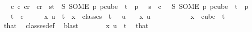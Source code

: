 \begin{isabellebody}
\ \ \ {\isachardoublequoteopen}{\isasymexists}c{}\ c{}{\isachardot}{\kern0pt}\ c{}{\isacharless}{\kern0pt}r\ {\isasymand}\ c{}{\isacharless}{\kern0pt}r\ {\isasymand}\ {\isacharparenleft}{\kern0pt}{\isasymforall}s{\isacharless}{\kern0pt}t{\isachardot}{\kern0pt}\ {\isasymchi}\ {\isacharparenleft}{\kern0pt}S\ {\isacharparenleft}{\kern0pt}SOME\ p{\isachardot}{\kern0pt}\ p{\isasymin}cube\ {}\ {\isacharparenleft}{\kern0pt}t{\isacharplus}{\kern0pt}{}{\isacharparenright}{\kern0pt}\ {\isasymand}\ p\ {}\ {\isacharequal}{\kern0pt}\ s{\isacharparenright}{\kern0pt}{\isacharparenright}{\kern0pt}\ {\isacharequal}{\kern0pt}\ c{}{\isacharparenright}{\kern0pt}\ {\isasymand}\ {\isasymchi}\ {\isacharparenleft}{\kern0pt}S\ {\isacharparenleft}{\kern0pt}SOME\ p{\isachardot}{\kern0pt}\ p{\isasymin}cube\ {}\ {\isacharparenleft}{\kern0pt}t{\isacharplus}{\kern0pt}{}{\isacharparenright}{\kern0pt}\ {\isasymand}\ p\ {}\ {\isacharequal}{\kern0pt}\ t{\isacharparenright}{\kern0pt}{\isacharparenright}{\kern0pt}\ {\isacharequal}{\kern0pt}\ c{}{\isachardoublequoteclose}\isanewline
%
\isadelimproof
%
\endisadelimproof
%
\isatagproof
{}\isamarkupfalse%
\ {\isacharminus}{\kern0pt}\isanewline
\ \ \isamarkupfalse%
\ {\isachardoublequoteopen}x\ u\ {\isacharless}{\kern0pt}\ t{\isachardoublequoteclose}\ \ {\isachardoublequoteopen}x\ {\isasymin}\ classes\ {}\ t\ {}{\isachardoublequoteclose}\ \ {\isachardoublequoteopen}u\ {\isacharless}{\kern0pt}\ {}{\isachardoublequoteclose}\ \ x\ u\ \isanewline
\ \ \isamarkupfalse%
\ {\isacharminus}{\kern0pt}\isanewline
\ \ \ \ \isamarkupfalse%
\ {\isachardoublequoteopen}x\ {\isasymin}\ cube\ {}\ {\isacharparenleft}{\kern0pt}t{\isacharplus}{\kern0pt}{}{\isacharparenright}{\kern0pt}{\isachardoublequoteclose}\ \isamarkupfalse%
\ that\ \isamarkupfalse%
\ classes{\isacharunderscore}{\kern0pt}def\ \isamarkupfalse%
\ blast\isanewline
\ \ \ \ \isamarkupfalse%
\ \isamarkupfalse%
\ {\isachardoublequoteopen}x\ u\ {\isasymin}\ {\isacharbraceleft}{\kern0pt}{\isachardot}{\kern0pt}{\isachardot}{\kern0pt}{\isacharless}{\kern0pt}t{\isacharplus}{\kern0pt}{}{\isacharbraceright}{\kern0pt}{\isachardoublequoteclose}\ \isamarkupfalse%
\ that\ \isamarkupfalse%

\end{isabellebody}
